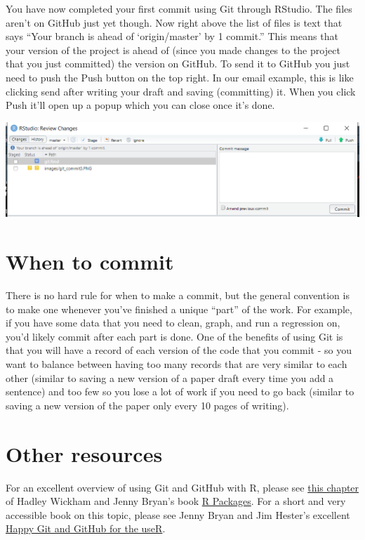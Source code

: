 \documentclass[
  12pt,
]{book}
\begin{document}
You have now completed your first commit using Git through RStudio. The files aren't on GitHub just yet though. Now right above the list of files is text that says ``Your branch is ahead of `origin/master' by 1 commit.'' This means that your version of the project is ahead of (since you made changes to the project that you just committed) the version on GitHub. To send it to GitHub you just need to push the Push button on the top right. In our email example, this is like clicking send after writing your draft and saving (committing) it. When you click Push it'll open up a popup which you can close once it's done.

\includegraphics{images/git_commit4.PNG}

\hypertarget{when-to-commit}{%
\section{When to commit}\label{when-to-commit}}

There is no hard rule for when to make a commit, but the general convention is to make one whenever you've finished a unique ``part'' of the work. For example, if you have some data that you need to clean, graph, and run a regression on, you'd likely commit after each part is done. One of the benefits of using Git is that you will have a record of each version of the code that you commit - so you want to balance between having too many records that are very similar to each other (similar to saving a new version of a paper draft every time you add a sentence) and too few so you lose a lot of work if you need to go back (similar to saving a new version of the paper only every 10 pages of writing).

\hypertarget{other-resources}{%
\section{Other resources}\label{other-resources}}

For an excellent overview of using Git and GitHub with R, please see \href{https://r-pkgs.org/Git.html}{this chapter} of Hadley Wickham and Jenny Bryan's book \href{https://r-pkgs.org/}{R Packages}. For a short and very accessible book on this topic, please see Jenny Bryan and Jim Hester's excellent \href{https://happyGitwithr.com/}{Happy Git and GitHub for the useR}.
\end{document}

